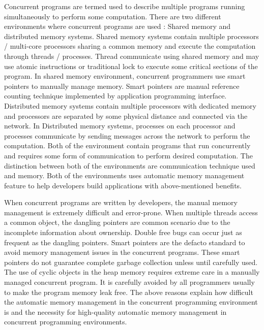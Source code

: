 Concurrent programs are termed used to describe multiple programs running simultaneously to perform some computation. There are two different environments where concurrent programs are used : Shared memory and distributed memory systems. Shared memory systems contain multiple processors / multi-core processors sharing a common memory and execute the computation through threads / processes. Thread communicate using shared memory and may use atomic instructions or traditional lock to execute some critical sections of the program. 
In shared memory environment, concurrent programmers use smart pointers to manually manage memory. Smart pointers are manual reference counting technique implemented by application programming interface. Distributed memory systems contain multiple processors with dedicated memory and processors are separated by some physical distance and connected via the network. In Distributed memory systems, processes on each processor and processes communicate by sending messages across the network to perform the computation. Both of the environment contain programs that run concurrently and requires some form of communication to perform desired computation. The distinction between both of the environments are communication technique used and memory. Both of the environments uses automatic memory management feature to help developers build applications with above-mentioned benefits. 

When concurrent programs are written by developers, the manual memory management is extremely difficult and error-prone. When multiple threads access a common object, the dangling pointers are common scenario due to the incomplete information about ownership. Double free bugs can occur just as frequent as the dangling pointers. Smart pointers are the defacto standard to avoid memory management issues in the concurrent programs. These smart pointers do not guarantee complete garbage collection unless until carefully used. The use of cyclic objects in the heap memory requires extreme care in a manually managed concurrent program. It is carefully avoided by all programmers usually to make the program memory leak free. The above reasons explain how difficult the automatic memory management in the concurrent programming environment is and the necessity for high-quality automatic memory management in concurrent programming environments. 

